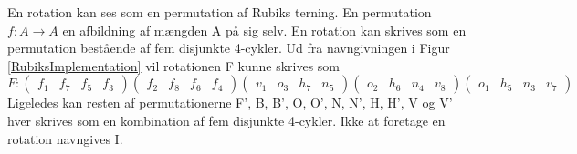 \documentclass[../main.tex]{subfiles}
\begin{document}
En rotation kan ses som en permutation af Rubiks terning. En permutation $f:A\rightarrow A$ en afbildning af mængden A på sig selv. En rotation kan skrives som en permutation bestående af fem disjunkte 4-cykler. Ud fra navngivningen i Figur \ref{RubiksImplementation} vil rotationen F kunne skrives som
$$F:(\begin{matrix}f_1 & f_7 & f_5 & f_3\end{matrix})
(\begin{matrix}f_2 & f_8 & f_6 & f_4\end{matrix})
(\begin{matrix}v_1 & o_3 & h_7 & n_5\end{matrix})
(\begin{matrix}o_2 & h_6 & n_4 & v_8\end{matrix})
(\begin{matrix}o_1 & h_5 & n_3 & v_7\end{matrix})$$
\noindent
Ligeledes kan resten af permutationerne F', B, B', O, O', N, N', H, H', V og V' hver skrives som en kombination af fem disjunkte 4-cykler. Ikke at foretage en rotation navngives I.
\end{document}
